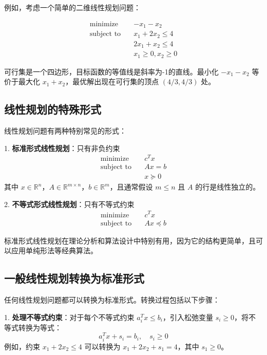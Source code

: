 \documentclass[12pt,a4paper]{book}
\begin{document}
例如，考虑一个简单的二维线性规划问题：

$$
\begin{aligned}
\text{minimize} \quad & -x_1 - x_2 \\
\text{subject to} \quad & x_1 + 2x_2 \leq 4 \\
& 2x_1 + x_2 \leq 4 \\
& x_1 \geq 0, x_2 \geq 0
\end{aligned}
$$

可行集是一个四边形，目标函数的等值线是斜率为-1的直线。最小化 $-x_1 - x_2$ 等价于最大化 $x_1 + x_2$，最优解出现在可行集的顶点 $(4/3, 4/3)$ 处。

\subsection{线性规划的特殊形式}

线性规划问题有两种特别常见的形式：

1. \textbf{标准形式线性规划}：只有非负约束
   $$
   \begin{aligned}
   \text{minimize} \quad & c^T x \\
   \text{subject to} \quad & Ax = b \\
   & x \succeq 0
   \end{aligned}
   $$
   其中 $x \in \mathbb{R}^n$，$A \in \mathbb{R}^{m \times n}$，$b \in \mathbb{R}^m$，且通常假设 $m \leq n$ 且 $A$ 的行是线性独立的。

2. \textbf{不等式形式线性规划}：只有不等式约束
   $$
   \begin{aligned}
   \text{minimize} \quad & c^T x \\
   \text{subject to} \quad & Ax \preceq b
   \end{aligned}
   $$

标准形式线性规划在理论分析和算法设计中特别有用，因为它的结构更简单，且可以应用单纯形法等经典算法。

\subsection{一般线性规划转换为标准形式}

任何线性规划问题都可以转换为标准形式。转换过程包括以下步骤：

1. \textbf{处理不等式约束}：对于每个不等式约束 $a_i^T x \leq b_i$，引入松弛变量 $s_i \geq 0$，将不等式转换为等式：
   $$
   a_i^T x + s_i = b_i, \quad s_i \geq 0
   $$
   例如，约束 $x_1 + 2x_2 \leq 4$ 可以转换为 $x_1 + 2x_2 + s_1 = 4$，其中 $s_1 \geq 0$。
\end{document}
